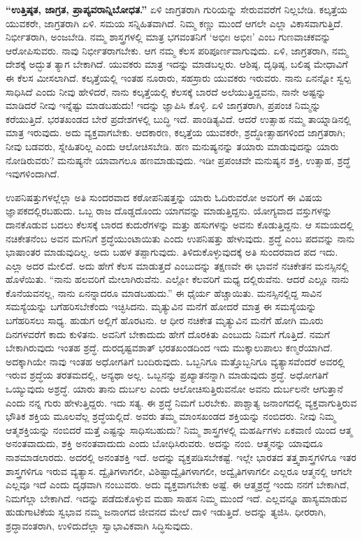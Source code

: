 \textbf{“ಉತ್ತಿಷ್ಠತ, ಜಾಗ್ರತ, ಪ್ರಾಪ್ಯವರಾನ್ನಿಬೋಧತ.”} ಏಳಿ ಜಾಗ್ರತರಾಗಿ ಗುರಿಯನ್ನು ಸೇರುವವರೆಗೆ ನಿಲ್ಲಬೇಡಿ. ಕಲ್ಕತ್ತೆಯ ಯುವಕರೇ, ಜಾಗ್ರತರಾಗಿ ಏಳಿ. ಸಮಯ ಸನ್ನಿಹಿತವಾಗಿದೆ. ನಿಮ್ಮ ಕಣ್ಣು ಮುಂದೆ ಆಗಲೇ ಎಲ್ಲಾ ವಿಕಾಸವಾಗುತ್ತಿದೆ. ನಿರ್ಭೀತರಾಗಿ, ಅಂಜಬೇಡಿ. ನಮ್ಮ ಶಾಸ್ತ್ರಗಳಲ್ಲಿ ಮಾತ್ರ ಭಗವಂತನಿಗೆ ‘ಅಭೀಃ ಅಭೀಃ’ ಎಂಬ ಗುಣವಾಚಕವನ್ನು ಆರೋಪಿಸುವರು. ನಾವು ನಿರ್ಭೀತರಾಗಬೇಕು. ಆಗ ನಮ್ಮ ಕೆಲಸ ಪರಿಪೂರ್ಣವಾಗುವುದು. ಏಳಿ, ಜಾಗ್ರತರಾಗಿ, ನಮ್ಮ ದೇಶಕ್ಕೆ ಅದ್ಭುತ ತ್ಯಾಗ ಬೇಕಾಗಿದೆ. ಯುವಕರು ಮಾತ್ರ ಇದನ್ನು ಮಾಡಬಲ್ಲರು. ಆಶಿಷ್ಠ, ದೃಢಿಷ್ಠ, ಬಲಿಷ್ಠ ಮೇಧಾವಿಗೆ ಈ ಕೆಲಸ ಮೀಸಲಾಗಿದೆ. ಕಲ್ಕತ್ತೆಯಲ್ಲಿ ಇಂತಹ ನೂರಾರು, ಸಹಸ್ರಾರು ಯುವಕರು ಇರುವರು. ನಾನು ಏನನ್ನೋ ಸ್ವಲ್ಪ ಸಾಧಿಸಿದೆ ಎಂದು ನೀವು ಹೇಳಿದರೆ, ನಾನು ಕಲ್ಕತ್ತೆಯಲ್ಲಿ ಕೆಲಸಕ್ಕೆ ಬಾರದೆ ಅಲೆಯುತ್ತಿದ್ದವನು, ನಾನೇ ಅಷ್ಟನ್ನು ಮಾಡಿದರೆ ನೀವು ಇನ್ನೆಷ್ಟು ಮಾಡಬಹುದು! ಇದನ್ನು ಜ್ಞಾಪಿಸಿ ಕೊಳ್ಳಿ. ಏಳಿ ಜಾಗ್ರತರಾಗಿ, ಪ್ರಪಂಚ ನಿಮ್ಮನ್ನು ಕರೆಯುತ್ತಿದೆ. ಭರತಖಂಡದ ಬೇರೆ ಪ್ರದೇಶಗಳಲ್ಲಿ ಬುದ್ಧಿ ಇದೆ. ಪಾಂಡಿತ್ಯವಿದೆ. ಆದರೆ ಉತ್ಸಾಹ ನಮ್ಮ ತಾಯ್ನಾಡಿನಲ್ಲಿ ಮಾತ್ರ ಇರುವುದು. ಅದು ವ್ಯಕ್ತವಾಗಬೇಕು. ಆದಕಾರಣ, ಕಲ್ಕತ್ತೆಯ ಯುವಕರೇ, ಶ್ರದ್ಧೋತ್ಸಾಹಗಳಿಂದ ಜಾಗ್ರತರಾಗಿ; ನೀವು ಬಡವರು, ಸ್ನೇಹಿತರಿಲ್ಲ ಎಂದು ಆಲೋಚಿಸಬೇಡಿ. ಹಣ ಮನುಷ್ಯನನ್ನು ತಯಾರು ಮಾಡುವುದನ್ನು ಯಾರು ನೋಡಿರುವರು? ಮನುಷ್ಯನೇ ಯಾವಾಗಲೂ ಹಣಮಾಡುವುದು. ಇಡೀ ಪ್ರಪಂಚವೇ ಮನುಷ್ಯನ ಶಕ್ತಿ, ಉತ್ಸಾಹ, ಶ್ರದ್ಧೆ ಇವುಗಳಿಂದಾಗಿದೆ. 

ಉಪನಿಷತ್ತುಗಳಲ್ಲೆಲ್ಲಾ ಅತಿ ಸುಂದರವಾದ ಕಠೋಪನಿಷತ್ತನ್ನು ಯಾರು ಓದಿರುವರೋ ಅವರಿಗೆ ಈ ವಿಷಯ ಜ್ಞಾಪಕದಲ್ಲಿರಬಹುದು. ಒಬ್ಬ ರಾಜ ದೊಡ್ಡದೊಂದು ಯಾಗವನ್ನು ಮಾಡುತ್ತಿದ್ದನು. ಯೋಗ್ಯವಾದ ವಸ್ತುಗಳನ್ನು ದಾನಕೊಡುವ ಬದಲು ಕೆಲಸಕ್ಕೆ ಬಾರದ ಕುದುರೆಗಳನ್ನು ಮತ್ತು ಹಸುಗಳನ್ನು ಅವನು ಕೊಡುತ್ತಿದ್ದನು. ಆ ಸಮಯದಲ್ಲಿ ನಚಿಕೇತನೆಂಬ ಅವನ ಮಗನಿಗೆ ಶ್ರದ್ಧೆಯುಂಟಾಯಿತು ಎಂದು ಉಪನಿಷತ್ತು ಹೇಳುವುದು. ಶ್ರದ್ಧೆ ಎಂಬ ಪದವನ್ನು ನಾನು ಭಾಷಾಂತರ ಮಾಡುವುದಿಲ್ಲ. ಅದು ಬಹಳ ತಪ್ಪಾಗುವುದು. ತಿಳಿದುಕೊಳ್ಳುವುದಕ್ಕೆ ಅತಿ ಸುಂದರವಾದ ಪದ ಇದು. ಎಲ್ಲಾ ಅದರ ಮೇಲಿದೆ. ಅದು ಹೇಗೆ ಕೆಲಸ ಮಾಡುತ್ತದೆ ಎಂಬುದನ್ನು ತಕ್ಷಣವೇ ಈ ಭಾವನೆ ನಚಿಕೇತನ ಮನಸ್ಸಿನಲ್ಲಿ ಹೊಳೆಯಿತು. “ನಾನು ಹಲವರಿಗೆ ಮೇಲಾಗಿರುವೆನು. ಎಲ್ಲೋ ಕೆಲವರಿಗೆ ಮಧ್ಯ ದಲ್ಲಿರುವೆನು. ಆದರೆ ಎಲ್ಲೂ ನಾನು ಕೊನೆಯವನಲ್ಲ, ನಾನು ಏನನ್ನಾದರೂ ಮಾಡಬಹುದು.” ಈ ಧೈರ್ಯ ಹೆಚ್ಚಾಯಿತು. ಮನಸ್ಸಿನಲ್ಲಿದ್ದ ಸಾವಿನ ಸಮಸ್ಯೆಯನ್ನು ಬಗೆಹರಿಸಬೇಕೆಂದು ಇಚ್ಛಿಸಿದನು. ಮೃತ್ಯುವಿನ ಮನೆಗೆ ಹೋದರೆ ಮಾತ್ರ ಈ ಸಮಸ್ಯೆಯನ್ನು ಬಗೆಹರಿಸಲು ಸಾಧ್ಯ. ಹುಡುಗ ಅಲ್ಲಿಗೆ ಹೊರಟನು. ಆ ಧೀರ ನಚಿಕೇತ ಮೃತ್ಯುವಿನ ಮನೆಗೆ ಹೋಗಿ ಮೂರು ದಿನಗಳವರೆಗೆ ಕಾದು ಕುಳಿತನು. ಅವನಿಗೆ ಬೇಕಾದುದು ಹೇಗೆ ದೊರಕಿತು ಎಂಬುದು ನಿಮಗೆ ಗೊತ್ತಿದೆ. ನಮಗೆ ಬೇಕಾಗಿರುವುದು ಇಂತಹ ಶ್ರದ್ಧೆ. ದುರದೃಷ್ಟವಶಾತ್​ ಭರತಖಂಡದಿಂದ ಇದು ಮುಕ್ಕಾಲುಪಾಲು ಕಣ್ಮರೆಯಾಗಿದೆ. ಅದಕ್ಕಾಗಿಯೇ ನಾವು ಇಂತಹ ಅಧೋಗತಿಗೆ ಬಂದಿರುವುದು. ಒಬ್ಬನಿಗೂ ಮತ್ತೊಬ್ಬನಿಗೂ ವ್ಯತ್ಯಾಸವೆಂದರೆ ಅವರಲ್ಲಿ ಇರುವ ಶ್ರದ್ಧೆಯ ತರತಮದಲ್ಲಿ, ಅನ್ಯಥಾ ಅಲ್ಲ. ಒಬ್ಬನನ್ನು ಪ್ರಖ್ಯಾತನನ್ನಾಗಿ ಮಾಡುವುದು ಶ್ರದ್ಧೆ. ಅಧೋಗತಿಗೆ ಒಯ್ಯುವುದು ಅಶ್ರದ್ಧೆ. ಯಾರು ತಾನು ದುರ್ಬಲ ಎಂದು ಆಲೋಚಿಸುತ್ತಿರುವನೋ ಅವನು ದುರ್ಬಲನೇ ಆಗುತ್ತಾನೆ ಎಂದು ನನ್ನ ಗುರು ಹೇಳುತ್ತಿದ್ದರು. ಇದು ಸತ್ಯ. ಈ ಶ್ರದ್ಧೆ ನಿಮಗೆ ಬರಬೇಕು. ಪಾಶ್ಚಾತ್ಯ ಜನಾಂಗದಲ್ಲಿ ವ್ಯಕ್ತವಾಗುತ್ತಿರುವ ಭೌತಿಕ ಶಕ್ತಿಯ ಮೂಲವೆಲ್ಲ ಶ್ರದ್ಧೆಯಲ್ಲಿದೆ. ಅವರು ತಮ್ಮ ಮಾಂಸಖಂಡದ ಶಕ್ತಿಯನ್ನು ನಂಬಿದರು. ನೀವು ನಿಮ್ಮ ಆತ್ಮಶಕ್ತಿಯನ್ನು ನಂಬಿದರೆ ಮತ್ತೆ ಎಷ್ಟನ್ನು ಸಾಧಿಸಬಹುದು? ನಿಮ್ಮ ಶಾಸ್ತ್ರಗಳಲ್ಲಿ ಮಹರ್ಷಿಗಳು ಏಕವಾಣಿ ಯಿಂದ ಆತ್ಮ ಅನಂತವಾದುದು, ಶಕ್ತಿ ಅನಂತವಾದುದು ಎಂದು ಬೋಧಿಸಿರುವರು. ಅದನ್ನು ನಂಬಿ. ಆತ್ಮನನ್ನು ಯಾವುದೂ ನಾಶಮಾಡಲಾರದು. ಅದರಲ್ಲಿ ಅನಂತಶಕ್ತಿ ಇದೆ. ಅದನ್ನು ವ್ಯಕ್ತಪಡಿಸಬೇಕಷ್ಟೆ. ಇಲ್ಲೇ ಭಾರತದ ತತ್ತ್ವಶಾಸ್ತ್ರಗಳಿಗೂ ಇತರ ಶಾಸ್ತ್ರಗಳಿಗೂ ಇರುವ ವ್ಯತ್ಯಾಸ. ದ್ವೈತಿಗಳಾಗಲೀ, ವಿಶಿಷ್ಟಾದ್ವೈತಿಗಳಾಗಲೀ, ಅದ್ವೈತಿಗಳಾಗಲೀ ಎಲ್ಲರೂ ಆತ್ಮನಲ್ಲಿ ಆಗಲೇ ಎಲ್ಲವೂ ಇದೆ ಎಂದು ದೃಢವಾಗಿ ನಂಬುವರು. ಅದು ವ್ಯಕ್ತವಾಗಬೇಕು ಅಷ್ಟೆ. ಈ ಆತ್ಮಶ್ರದ್ಧೆ ಇಂದು ನನಗೆ ಬೇಕಾಗಿದೆ, ನಿಮಗೆಲ್ಲಾ ಬೇಕಾಗಿದೆ. ಇದನ್ನು ಪಡೆದುಕೊಳ್ಳುವ ಮಹಾ ಸಾಹಸ ನಿಮ್ಮ ಮುಂದೆ ಇದೆ. ಎಲ್ಲವನ್ನೂ ಹಾಸ್ಯಮಾಡುವ ಹುಡುಗಾಟಿಕೆಯ ಸ್ವಭಾವ ನಮ್ಮ ಜನಾಂಗದ ಜೀವನದ ಮೇಲೆ ದಾಳಿ ಇಡುತ್ತಿದೆ. ಅದನ್ನು ತ್ಯಜಿಸಿ. ಧೀರರಾಗಿ, ಶ್ರದ್ಧಾವಂತರಾಗಿ, ಉಳಿದುದೆಲ್ಲಾ ಸ್ವಾಭಾವಿಕವಾಗಿ ಸಿದ್ಧಿಸುವುದು. 

